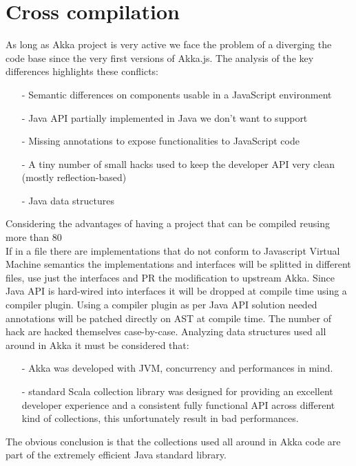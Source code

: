 \documentclass{sig-alternate}
\begin{document}
\section{Cross compilation}\label{sec:cross-compilation}

As long as Akka project is very active we face the problem of a diverging the code base since the very first versions of Akka.js.
The analysis of the key differences highlights these conflicts:
\begin{itemize}
	\item[-] Semantic differences on components usable in a JavaScript environment
	\item[-] Java API partially implemented in Java we don't want to support
	\item[-] Missing annotations to expose functionalities to JavaScript code
	\item[-] A tiny number of small hacks used to keep the developer API very clean (mostly reflection-based)
	\item[-] Java data structures
\end{itemize}
Considering the advantages of having a project that can be compiled reusing more than 80%
\\
If in a file there are implementations that do not conform to Javascript Virtual Machine semantics the implementations and interfaces will be splitted in different files, use just the interfaces and PR the modification to upstream Akka.
Since Java API is hard-wired into interfaces it will be dropped at compile time using a compiler plugin.
Using a compiler plugin as per Java API solution needed annotations will be patched directly on AST at compile time.
The number of hack are hacked themselves case-by-case.
Analyzing data structures used all around in Akka it must be considered that:
\begin{itemize}
	\item[-] Akka was developed with JVM, concurrency and performances in mind.
	\item[-] standard Scala collection library was designed for providing an excellent developer experience and a consistent fully functional API across different kind of collections, this unfortunately result in bad performances.
\end{itemize}
The obvious conclusion is that the collections used all around in Akka code are part of the extremely efficient Java standard library.
\end{document}
